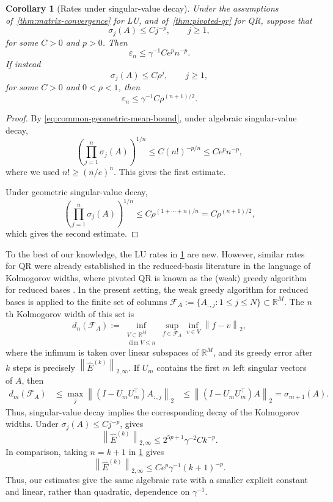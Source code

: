 \documentclass[11pt]{article}
\newtheorem{corollary}[corollary]{Corollary}
\theoremstyle{definition}
\theoremstyle{remark}
\newcommand{\R}{\mathbb{R}}
\newcommand{\norm}[1]{\left\lVert #1\right\rVert}
\begin{document}
\begin{corollary}[Rates under singular-value decay]
\label{cor:matrix-convergence-rates}
Under the assumptions of~\cref{thm:matrix-convergence} for LU, and
of~\cref{thm:pivoted-qr} for QR, suppose that
\[
    \sigma_j(A)\le Cj^{-p},
    \qquad
    j\ge1,
\]
for some $C>0$ and $p>0$. Then
\[
    \varepsilon_n
    \le
    \gamma^{-1}Ce^p n^{-p}.
\]
If instead
\[
    \sigma_j(A)\le C\rho^j,
    \qquad
    j\ge1,
\]
for some $C>0$ and $0<\rho<1$, then
\[
    \varepsilon_n
    \le
    \gamma^{-1}C\rho^{(n+1)/2}.
\]
\end{corollary}

\begin{proof}
By \eqref{eq:common-geometric-mean-bound}, under algebraic singular-value
decay,
\[
    \left(\prod_{j=1}^n\sigma_j(A)\right)^{1/n}
    \le
    C(n!)^{-p/n}
    \le
    Ce^p n^{-p},
\]
where we used $n!\ge(n/e)^n$. This gives the first estimate.

Under geometric singular-value decay,
\[
    \left(\prod_{j=1}^n\sigma_j(A)\right)^{1/n}
    \le
    C\rho^{(1+\cdots+n)/n}
    =
    C\rho^{(n+1)/2},
\]
which gives the second estimate.
\end{proof}

To the best of our knowledge, the LU rates in
\cref{cor:matrix-convergence-rates} are new.
However,
similar rates for QR were
already established in the reduced-basis literature in the language of Kolmogorov widths, where pivoted
QR is known as the (weak) greedy algorithm for reduced bases
\cite{BinevEtAl2011,DeVorePetrovaWojtaszczyk2013}.
In the present setting, the weak greedy algorithm for reduced bases is
applied to the finite set of columns
$
    \mathcal F_A
    :=
    \{A_{:,j}:1\le j\le N\}
    \subset\R^M.
$
The $n$th Kolmogorov width of this set is
\[
    d_n(\mathcal F_A)
    :=
    \inf_{\substack{V\subset\R^M\\ \dim V\le n}}
    \sup_{f\in\mathcal F_A}
    \inf_{v\in V}\norm{f-v}_2,
\]
where the infimum is taken over linear subspaces of $\R^M$, and its
greedy error after $k$ steps is precisely
$\norm{\widehat E^{(k)}}_{2,\infty}$.
If $U_m$ contains the first $m$ left singular vectors of $A$, then
\[
\begin{aligned}
    d_m(\mathcal F_A)
    &\le
    \max_j
    \norm{(I-U_mU_m^\top)A_{:,j}}_2
    &\le
    \norm{(I-U_mU_m^\top)A}_2
    =
    \sigma_{m+1}(A).
\end{aligned}
\]
Thus, singular-value decay implies the corresponding decay of the
Kolmogorov widths. Under $\sigma_j(A)\le Cj^{-p}$,
\cite[Corollary~3.3(ii)]{DeVorePetrovaWojtaszczyk2013} gives
\[
    \norm{\widehat E^{(k)}}_{2,\infty}
    \le
    2^{5p+1}\gamma^{-2}Ck^{-p}.
\]
In comparison, taking $n=k+1$ in
\cref{cor:matrix-convergence-rates} gives
\[
    \norm{\widehat E^{(k)}}_{2,\infty}
    \le
    Ce^p\gamma^{-1}(k+1)^{-p}.
\]
Thus, our estimates give the same algebraic rate with a smaller
explicit constant and linear, rather than quadratic, dependence on
$\gamma^{-1}$.
\end{document}
